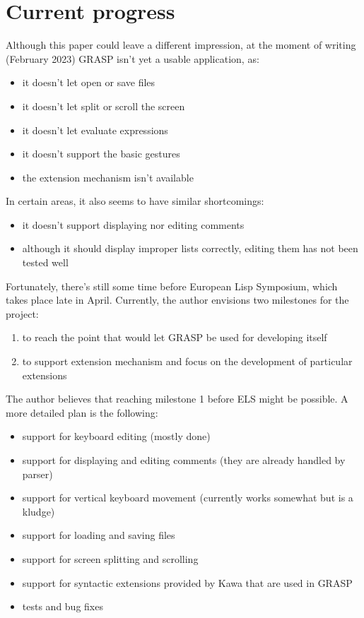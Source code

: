 \documentclass[sigconf]{acmart}
\begin{document}


\section{Current progress}

Although this paper could leave a different impression,
at the moment of writing (February 2023) GRASP isn't yet 
a usable application, as:
\begin{itemize}
\item it doesn't let open or save files
\item it doesn't let split or scroll the screen
\item it doesn't let evaluate expressions
\item it doesn't support the basic gestures
\item the extension mechanism isn't available
\end{itemize}

In certain areas, it also seems to have similar
shortcomings:
\begin{itemize}
\item it doesn't support displaying nor editing
comments
\item although it should display improper lists correctly, 
editing them has not been tested well
\end{itemize}

Fortunately, there's still some time before
European Lisp Symposium, which takes place late
in April. Currently, the author envisions two
milestones for the project:
\begin{enumerate}
\item to reach the point that would let GRASP
be used for developing itself
\item to support extension mechanism and focus
on the development of particular extensions
\end{enumerate}

The author believes that reaching milestone 1
before ELS might be possible. A more detailed
plan is the following:
\begin{itemize}
\item support for keyboard editing (mostly done)
\item support for displaying and editing comments
(they are already handled by parser)
\item support for vertical keyboard movement
(currently works somewhat but is a kludge)
\item support for loading and saving files
\item support for screen splitting and scrolling
\item support for syntactic extensions provided
by Kawa that are used in GRASP
\item tests and bug fixes
\end{itemize}
\end{document}
